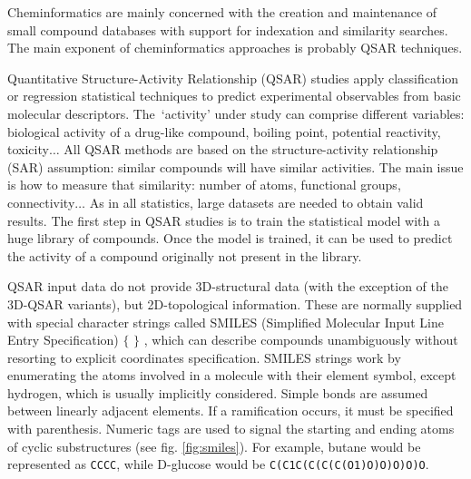 Cheminformatics are mainly concerned with the creation and maintenance of small compound databases with support for indexation and similarity searches. The main exponent of cheminformatics approaches is probably Q\/SAR techniques.

Quantitative Structure-Activity Relationship (Q\/SAR) studies apply classification or regression statistical techniques to predict experimental observables from basic molecular descriptors. The\ ‘activity’ under study can comprise different variables: biological activity of a drug-like compound, boiling point, potential reactivity, toxicity$ \ldots $  All Q\/SAR methods are based on the structure-activity relationship (SAR) assumption: similar compounds will have similar activities. The main issue is how to measure that similarity: number of atoms, functional groups, connectivity$ \ldots $   As in all statistics, large datasets are needed to obtain valid results. The first step in Q\/SAR studies is to train the statistical model with a huge library of compounds. Once the model is trained, it can be used to predict the activity of a compound originally not present in the library.

Q\/SAR input data do not provide 3D-structural data (with the exception of the 3D-Q\/SAR variants), but 2D-topological information. These are normally supplied with special character strings called SMILES (Simplified Molecular Input Line Entry Specification) $ \{ $ $ \} $ , which can describe compounds unambiguously without resorting to explicit coordinates specification. SMILES strings work by enumerating the atoms involved in a molecule with their element symbol, except hydrogen, which is usually implicitly considered. Simple bonds are assumed between linearly adjacent elements. If a ramification occurs, it must be specified with parenthesis. Numeric tags are used to signal the starting and ending atoms of cyclic substructures (see fig. \ref{fig:smiles}). For example, butane would be represented as \texttt{CCCC}, while D-glucose would be \texttt{C(C1C(C(C(C(O1)O)O)O)O)O}.


